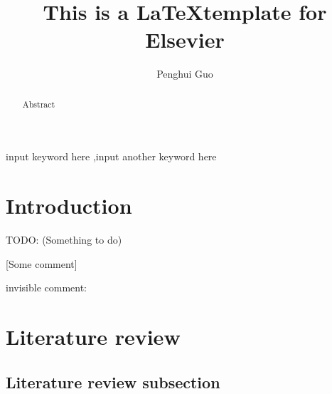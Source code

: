 \documentclass[3p,review,a4paper]{elsarticle}
\newcommand\todo[1]{{\textcolor{NavyBlue}{\sc TODO: (#1)}}}
\newcommand\cmt[1]{{\textcolor{NavyBlue}{[#1]}}}
\newcommand\highlight[1]{{\color{NavyBlue}{#1}}}
\begin{document}
\hypersetup{allcolors=NavyBlue}  

\begin{frontmatter}

\title{This is a \LaTeX template for Elsevier}


\author[nuaa]{Penghui Guo
}

\address[nuaa]{College of Economics and Management, Nanjing University of Aeronautics and Astronautics, Nanjing 211106, China}


\begin{abstract}
        Abstract
\end{abstract}

\begin{keyword}
        input keyword here
        \sep input another keyword here
\end{keyword}

\end{frontmatter}


\newpage

\section{Introduction} \label{SEC: Introduction}

\todo{Something to do}

\highlight{Something be highlighted}

\cmt{Some comment}

invisible comment:

\section{Literature review} \label{SEC: Related works}
 
\subsection{Literature review subsection} \label{SUBSEC: Literature review subsection}
\end{document}
